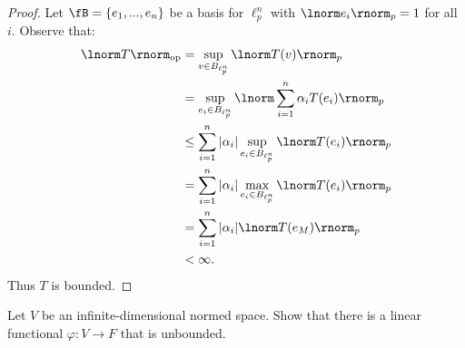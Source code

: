 \documentclass[11pt,twoside,openany]{memoir}
\begin{document}
        \begin{proof}
            Let $\fB = \{e_1,...,e_n\}$ be a basis for $\ell_p^n$ with $\lnorm e_i \rnorm_p = 1$ for all $i$. Observe that:
                \begin{equation*}
                \begin{split}
                    \lnorm T \rnorm_\text{op} 
                    & = \sup_{v \in B_{\ell_p^n}} \lnorm T(v) \rnorm_p \\
                    & = \sup_{e_i \in B_{\ell_p^n}} \lnorm \sum_{i = 1}^n \alpha_iT(e_i) \rnorm_p \\
                    & \leq \sum_{i = 1}^n  |\alpha_i|\sup_{e_i \in B_{\ell_p^n}}\lnorm T(e_i) \rnorm_p \\
                    & = \sum_{i = 1}^n  |\alpha_i|\max_{e_i \in B_{\ell_p^n}}\lnorm T(e_i) \rnorm_p \\
                    & = \sum_{i = 1}^n |\alpha_i|\lnorm T(e_M) \rnorm_p \\
                    & < \infty.
                \end{split}
                \end{equation*}
            Thus $T$ is bounded.
        \end{proof}
    \addtocounter{exercise}{1}
    \begin{exercise}
        Let $V$ be an infinite-dimensional normed space. Show that there is a linear functional $\varphi:V \rightarrow F$ that is unbounded.
    \end{exercise}
\end{document}
